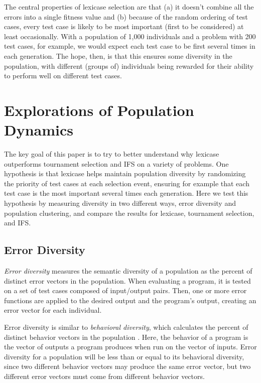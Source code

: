 The central properties of lexicase selection are that (a) it doesn't combine all the errors into a single
fitness value and (b) because of the random ordering of test cases, every test case is likely to be
most important (first to be considered) at least occasionally. With a population of 1,000 individuals
and a problem with 200 test cases, for example, we would expect each test case to be first several
times in each generation. The hope, then, is that this ensures some diversity in the population, with
different (groups of) individuals being rewarded for their ability to perform well on different test
cases.


\section{Explorations of Population Dynamics}


The key goal of this paper is to try to better understand why lexicase outperforms tournament selection
and IFS on a variety of problems. One hypothesis is that lexicase helps maintain population diversity
by randomizing the priority of test cases at each selection event, ensuring for example that each test 
case is the most important several times each generation. Here we test this hypothesis by measuring 
diversity in two different ways, error diversity and population clustering, and compare the results 
for lexicase, tournament selection, and IFS.

\subsection{Error Diversity}
\label{sec:errorDiversityDef}

\textit{Error diversity} measures the semantic diversity of a population as the percent of distinct error vectors in the population. When evaluating a program, it is tested on a set of test cases composed of input/output pairs. Then, one or more error functions are applied to the desired output and the program's output, creating an error vector for each individual.

Error diversity is similar to \textit{behavioral diversity}, which calculates the percent of distinct behavior vectors in the population \citep{Jackson:2010:PPSN}. Here, the behavior of a program is the vector of outputs a program produces when run on the vector of inputs. Error diversity for a population will be less than or equal to its behavioral diversity, since two different behavior vectors may produce the same error vector, but two different error vectors must come from different behavior vectors.

